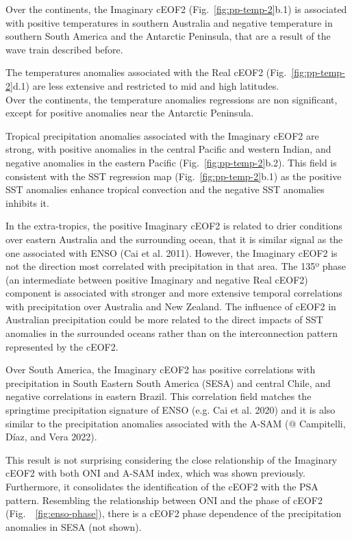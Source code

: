 \documentclass[smallextended]{svjour3}       %
\begin{document}
Over the continents, the Imaginary cEOF2 (Fig.~\ref{fig:pp-temp-2}b.1) is associated with positive temperatures in southern Australia and negative temperature in southern South America and the Antarctic Peninsula, that are a result of the wave train described before.

The temperatures anomalies associated with the Real cEOF2 (Fig.~\ref{fig:pp-temp-2}d.1) are less extensive and restricted to mid and high latitudes.\\
Over the continents, the temperature anomalies regressions are non significant, except for positive anomalies near the Antarctic Peninsula.

Tropical precipitation anomalies associated with the Imaginary cEOF2 are strong, with positive anomalies in the central Pacific and western Indian, and negative anomalies in the eastern Pacific (Fig.~\ref{fig:pp-temp-2}b.2).
This field is consistent with the SST regression map (Fig.~\ref{fig:pp-temp-2}b.1) as the positive SST anomalies enhance tropical convection and the negative SST anomalies inhibits it.

In the extra-tropics, the positive Imaginary cEOF2 is related to drier conditions over eastern Australia and the surrounding ocean, that it is similar signal as the one associated with ENSO (Cai et al. 2011).
However, the Imaginary cEOF2 is not the direction most correlated with precipitation in that area.
The 135º phase (an intermediate between positive Imaginary and negative Real cEOF2) component is associated with stronger and more extensive temporal correlations with precipitation over Australia and New Zealand.
The influence of cEOF2 in Australian precipitation could be more related to the direct impacts of SST anomalies in the surrounded oceans rather than on the interconnection pattern represented by the cEOF2.

Over South America, the Imaginary cEOF2 has positive correlations with precipitation in South Eastern South America (SESA) and central Chile, and negative correlations in eastern Brazil. This correlation field matches the springtime precipitation signature of ENSO (e.g. Cai et al. 2020) and it is also similar to the precipitation anomalies associated with the A-SAM (@ Campitelli, Díaz, and Vera 2022).

This result is not surprising considering the close relationship of the Imaginary cEOF2 with both ONI and A-SAM index, which was shown previously.\\
Furthermore, it consolidates the identification of the cEOF2 with the PSA pattern. Resembling the relationship between ONI and the phase of cEOF2 (Fig.~~\ref{fig:enso-phase}), there is a cEOF2 phase dependence of the precipitation anomalies in SESA (not shown).
\end{document}

